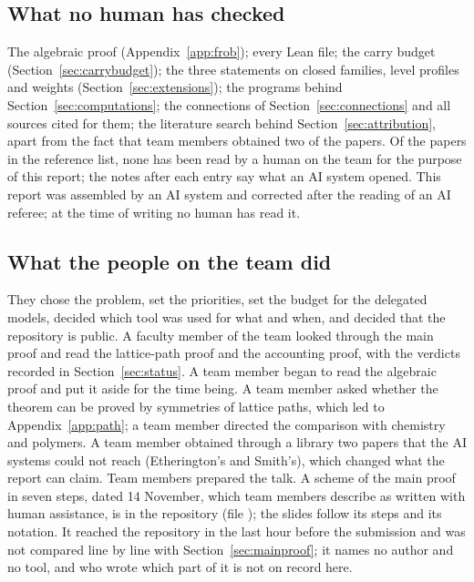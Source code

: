 \documentclass[11pt]{article}
\theoremstyle{definition}
\theoremstyle{remark}
\numberwithin{equation}{section}
\numberwithin{figure}{section}
\begin{document}
\subsection{What no human has checked}
The algebraic proof (Appendix~\ref{app:frob}); every Lean file; the carry budget
(Section~\ref{sec:carrybudget}); the three statements on closed families, level profiles and weights
(Section~\ref{sec:extensions}); the programs behind Section~\ref{sec:computations}; the connections of
Section~\ref{sec:connections} and all sources cited for them; the literature search behind
Section~\ref{sec:attribution}, apart from the fact that team members obtained two of the papers. Of the papers
in the reference list, none has been read by a human on the team for the purpose of this report; the notes
after each entry say what an AI system opened.
This report was assembled by an AI system and corrected after the reading of an AI referee; at the time of
writing no human has read it.

\subsection{What the people on the team did}
They chose the problem, set the priorities, set the budget for the delegated models, decided which tool was used for what and when, and decided that
the repository is public. A faculty member of the team looked through the main proof and read the
lattice-path proof and the accounting proof, with the verdicts recorded in Section~\ref{sec:status}. A team
member began to read the algebraic proof and put it aside for the time being. A team
member asked whether the theorem can be proved by symmetries of lattice paths, which led to
Appendix~\ref{app:path}; a team member directed the comparison with chemistry and polymers. A team member obtained
through a library two papers that the AI systems could not reach (Etherington's and Smith's), which changed
what the report can claim. Team members prepared the talk. A scheme of the main proof in seven steps, dated
14 November, which team members describe as written with human assistance, is in the repository (file
); the slides follow its steps and its
notation. It reached the repository in the last hour before the submission and was not compared line by line
with Section~\ref{sec:mainproof}; it names no author and no tool, and who wrote which part of it is not on
record here.
\end{document}
